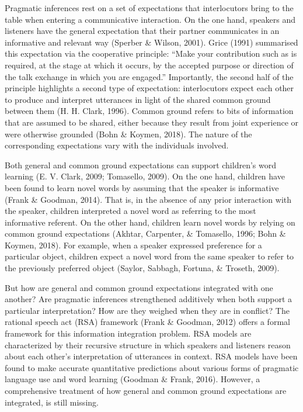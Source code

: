 \documentclass[10pt, letterpaper]{article}
\begin{document}
Pragmatic inferences rest on a set of expectations that interlocutors
bring to the table when entering a communicative interaction. On the one
hand, speakers and listeners have the general expectation that their
partner communicates in an informative and relevant way (Sperber \&
Wilson, 2001). Grice (1991) summarised this expectation via the
cooperative principle: ``Make your contribution such as is required, at
the stage at which it occurs, by the accepted purpose or direction of
the talk exchange in which you are engaged.'' Importantly, the second
half of the principle highlights a second type of expectation:
interlocutors expect each other to produce and interpret utterances in
light of the shared common ground between them (H. H. Clark, 1996).
Common ground refers to bits of information that are assumed to be
shared, either because they result from joint experience or were
otherwise grounded (Bohn \& Koymen, 2018). The nature of the
corresponding expectations vary with the individuals involved.

Both general and common ground expectations can support children's word
learning (E. V. Clark, 2009; Tomasello, 2009). On the one hand, children
have been found to learn novel words by assuming that the speaker is
informative (Frank \& Goodman, 2014). That is, in the absence of any
prior interaction with the speaker, children interpreted a novel word as
referring to the most informative referent. On the other hand, children
learn novel words by relying on common ground expectations (Akhtar,
Carpenter, \& Tomasello, 1996; Bohn \& Koymen, 2018). For example, when
a speaker expressed preference for a particular object, children expect
a novel word from the same speaker to refer to the previously preferred
object (Saylor, Sabbagh, Fortuna, \& Troseth, 2009).

But how are general and common ground expectations integrated with one
another? Are pragmatic inferences strengthened additively when both
support a particular interpretation? How are they weighed when they are
in conflict? The rational speech act (RSA) framework (Frank \& Goodman,
2012) offers a formal framework for this information integration
problem. RSA models are characterized by their recursive structure in
which speakers and listeners reason about each other's interpretation of
utterances in context. RSA models have been found to make accurate
quantitative predictions about various forms of pragmatic language use
and word learning (Goodman \& Frank, 2016). However, a comprehensive
treatment of how general and common ground expectations are integrated,
is still missing.
\end{document}
